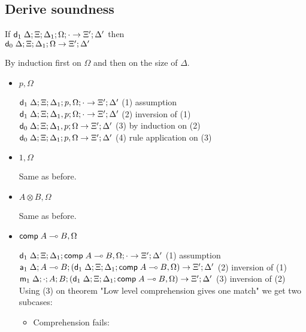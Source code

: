 \subsection{Derive soundness}

If $\mathsf{d}_1 \; \Delta; \Xi; \Delta_1; \Omega; \cdot \rightarrow \Xi'; \Delta'$ then \\
$\mathsf{d}_0 \; \Delta; \Xi; \Delta_1; \Omega \rightarrow \Xi'; \Delta'$

By induction first on $\Omega$ and then on the size of $\Delta$.

\begin{itemize}
\item $p, \Omega$

$\mathsf{d}_1 \; \Delta; \Xi; \Delta_1; p, \Omega; \cdot \rightarrow \Xi'; \Delta'$ \hfill (1) assumption \\
$\mathsf{d}_1 \; \Delta; \Xi; \Delta_1, p; \Omega; \cdot \rightarrow \Xi'; \Delta'$ \hfill (2) inversion of (1) \\
$\mathsf{d}_0 \; \Delta; \Xi; \Delta_1, p; \Omega \rightarrow \Xi'; \Delta'$ \hfill (3) by induction on (2) \\
$\mathsf{d}_0 \; \Delta; \Xi; \Delta_1; p, \Omega \rightarrow \Xi'; \Delta'$ \hfill (4) rule application on (3) \\

\item $1, \Omega$

Same as before.

\item $A \otimes B, \Omega$

Same as before.

\item $\mathsf{comp} \; A \multimap B, \Omega$

$\mathsf{d}_1 \; \Delta; \Xi; \Delta_1; \mathsf{comp} \; A \multimap B, \Omega; \cdot \rightarrow \Xi'; \Delta'$ \hfill (1) assumption \\
$\mathsf{a}_1 \; \Delta; A \multimap B; (\mathsf{d}_1 \; \Delta; \Xi; \Delta_1; \mathsf{comp} \; A \multimap B, \Omega) \rightarrow \Xi'; \Delta'$ \hfill (2) inversion of (1) \\
$\mathsf{m}_1 \; \Delta; \cdot; A; B ; (\mathsf{d}_1 \; \Delta; \Xi; \Delta_1; \mathsf{comp} \; A \multimap B, \Omega) \rightarrow \Xi'; \Delta'$ \hfill (3) inversion of (2) \\
Using (3) on theorem "Low level comprehension gives one match" we get two subcases:

\begin{itemize}
\item Comprehension fails:


\end{itemize}
\end{itemize}
